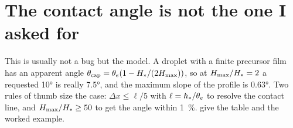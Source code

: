 \section{The contact angle is not the one I asked for}
\label{sec:trouble:angle}

This is usually not a bug but the model. A droplet with a finite precursor film
has an apparent angle $\theta_{\mathrm{cap}} = \theta_{e}(1 - H_{*}/(2H_{\mathrm{max}}))$, so at
$H_{\mathrm{max}}/H_{*} = 2$ a requested \ang{10} is really \ang{7.5}, and the maximum
slope of the profile is \ang{0.63}. Two rules of thumb size the case: $\Delta x
\le \ell/5$ with $\ell = h_{*}/\theta_{e}$ to resolve the contact line, and
$H_{\mathrm{max}}/H_{*} \ge 50$ to get the angle within \SI{1}{\percent}.
 give the table and the worked
example.
